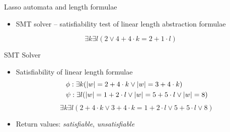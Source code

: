 \begin{frame}{Lasso automata and length formulae}
    \begin{figure}
        \centerline{%
        }%
    \end{figure}
    
     {
        \begin{itemize}
            \item SMT solver -- satisfiability test of linear length abstraction formulae
        \end{itemize}
        $$\exists k \exists l (2 \lor 4 + 4 \cdot k = 2 + 1 \cdot l)$$
    }
\end{frame}

\begin{frame}{SMT Solver}
    \begin{itemize}
        \item Satisfiability of linear length formulae
        \begin{align*}
            \large &\phi: \exists k (|w| = 2 + 4 \cdot k \lor |w| = 3 + 4 \cdot k) \\
            \large &\psi: \exists l (|w| = 1 + 2 \cdot l \lor |w| = 5 + 5 \cdot l \lor |w| = 8)
        \end{align*}
        \large $$\exists k \exists l (2 + 4 \cdot k \lor 3 + 4 \cdot k = 1 + 2 \cdot l \lor 5 + 5 \cdot l \lor 8)$$
        \normalsize
        \item Return values: \emph{satisfiable}, \emph{unsatisfiable}
    \end{itemize}
\end{frame}

